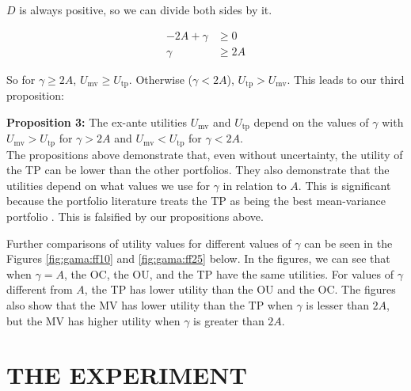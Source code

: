 \documentclass[12pt,oneside,a4paper]{memoir}
\begin{document}
\noindent 
$D$ is always positive, so we can divide both sides by it.

\vspace{-1 em}
\begin{align*}
-2A + \gamma & \geq 0
\\
\gamma & \geq 2A
\end{align*}

So for $\gamma \geq 2A$, $U_{\mathrm{mv}} \geq U_{\mathrm{tp}}$.
Otherwise ($\gamma < 2A$), $U_{\mathrm{tp}} > U_{\mathrm{mv}}$.
This leads to our third proposition:

\noindent
\textbf{Proposition 3:}
The ex-ante utilities $U_{\mathrm{mv}}$ and $U_{\mathrm{tp}}$ depend on the values of $\gamma$ with
$U_{\mathrm{mv}} > U_{\mathrm{tp}}$ for $\gamma > 2A$ and 
$U_{\mathrm{mv}} < U_{\mathrm{tp}}$ for $\gamma < 2A$. \\



The propositions above demonstrate that, even without uncertainty, the utility of the TP can be lower than the other portfolios. They also demonstrate that the utilities depend on what values we use for $\gamma$ in relation to $A$. This is significant because the portfolio literature treats the TP as being the best mean-variance portfolio \cite{memmel-2006, jones-1999, dgu2009}. This is falsified by our propositions above.

Further comparisons of utility values for different values of $\gamma$ can be seen in the Figures \ref{fig:gama:ff10} and \ref{fig:gama:ff25} below. In the figures, we can see that when $\gamma=A$, the OC, the OU, and the TP have the same utilities. For values of $\gamma$ different from $A$, the TP has lower utility than the OU and the OC. The figures also show that the MV has lower utility than the TP when $\gamma$ is lesser than $2A$, but the MV has higher utility when $\gamma$ is greater than $2A$.


\section{THE EXPERIMENT} \label{sec:experiment:tp}
\end{document}
